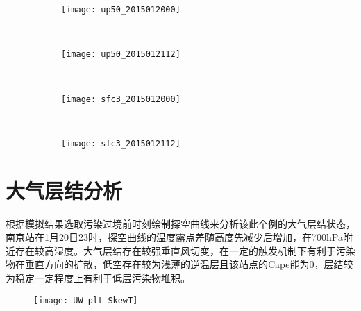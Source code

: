 \begin{figure}[!htbp]
    \centering
    \begin{subfigure}[b]{0.40\textwidth}
      \texttt{[image: up50\_2015012000]}
      \caption{}
      \label{fig:up50_2015012000}
    \end{subfigure}%
    ~%
    \begin{subfigure}[b]{0.40\textwidth}
      \texttt{[image: up50\_2015012112]}
      \caption{}
      \label{fig:up50_2015012112}
    \end{subfigure}
    \\%
    \begin{subfigure}[b]{0.40\textwidth}
      \texttt{[image: sfc3\_2015012000]}
      \caption{}
      \label{fig:sfc3_2015012000}
    \end{subfigure}%
    ~%
    \begin{subfigure}[b]{0.40\textwidth}
      \texttt{[image: sfc3\_2015012112]}
      \caption{}
      \label{fig:sfc3_2015012112}
    \end{subfigure}
    \label{fig:oaspl}
\end{figure}

\section{大气层结分析}

根据模拟结果选取污染过境前时刻绘制探空曲线来分析该此个例的大气层结状态，南京站在1月20日23时，探空曲线的温度露点差随高度先减少后增加，在700hPa附近存在较高湿度。大气层结存在较强垂直风切变，在一定的触发机制下有利于污染物在垂直方向的扩散，低空存在较为浅薄的逆温层且该站点的Cape能为0，层结较为稳定一定程度上有利于低层污染物堆积。

\begin{figure}[!htbp]
    \centering
    \texttt{[image: UW-plt\_SkewT]}
    \label{fig:UW-plt_SkewT_trim}
\end{figure}

